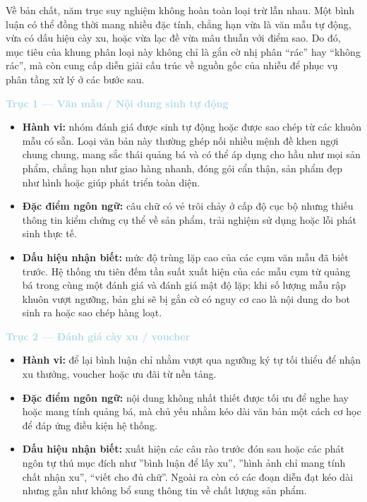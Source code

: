 Về bản chất, năm trục suy nghiệm không hoàn toàn loại trừ lẫn nhau. Một bình luận có thể đồng thời mang nhiều đặc tính, chẳng hạn vừa là văn mẫu tự động, vừa có dấu hiệu cày xu, hoặc vừa lạc đề vừa mâu thuẫn với điểm sao. Do đó, mục tiêu của khung phân loại này không chỉ là gắn cờ nhị phân ``rác'' hay ``không rác'', mà còn cung cấp diễn giải cấu trúc về nguồn gốc của nhiễu để phục vụ phân tầng xử lý ở các bước sau.

\vspace{0.5em}
\noindent\textcolor{lightblue}{\textbf{Trục 1 --- Văn mẫu / Nội dung sinh tự động}}\par
\vspace{0.5em}

\begin{itemize}[labelsep=10pt, leftmargin=2cm]
    \item \textbf{Hành vi:} nhóm đánh giá được sinh tự động hoặc được sao chép từ các khuôn mẫu có sẵn. Loại văn bản này thường ghép nối nhiều mệnh đề khen ngợi chung chung, mang sắc thái quảng bá và có thể áp dụng cho hầu như mọi sản phẩm, chẳng hạn như giao hàng nhanh, đóng gói cẩn thận, sản phẩm đẹp như hình hoặc giúp phát triển toàn diện.
    \item \textbf{Đặc điểm ngôn ngữ:} câu chữ có vẻ trôi chảy ở cấp độ cục bộ nhưng thiếu thông tin kiểm chứng cụ thể về sản phẩm, trải nghiệm sử dụng hoặc lỗi phát sinh thực tế.
    \item \textbf{Dấu hiệu nhận biết:} mức độ trùng lặp cao của các cụm văn mẫu đã biết trước. Hệ thống ưu tiên đếm tần suất xuất hiện của các mẫu cụm từ quảng bá trong cùng một đánh giá và đánh giá mật độ lặp; khi số lượng mẫu rập khuôn vượt ngưỡng, bản ghi sẽ bị gắn cờ có nguy cơ cao là nội dung do bot sinh ra hoặc sao chép hàng loạt.
\end{itemize}

\vspace{0.5em}
\noindent\textcolor{lightblue}{\textbf{Trục 2 --- Đánh giá cày xu / voucher}}\par
\vspace{0.5em}

\begin{itemize}[labelsep=10pt, leftmargin=2cm]
    \item \textbf{Hành vi:} để lại bình luận chỉ nhằm vượt qua ngưỡng ký tự tối thiểu để nhận xu thưởng, voucher hoặc ưu đãi từ nền tảng.
    \item \textbf{Đặc điểm ngôn ngữ:} nội dung không nhất thiết được tối ưu để nghe hay hoặc mang tính quảng bá, mà chủ yếu nhằm kéo dài văn bản một cách cơ học để đáp ứng điều kiện hệ thống.
    \item \textbf{Dấu hiệu nhận biết:} xuất hiện các câu rào trước đón sau hoặc các phát ngôn tự thú mục đích như ''bình luận để lấy xu'', ''hình ảnh chỉ mang tính chất nhận xu'', ``viết cho đủ chữ''. Ngoài ra còn có các đoạn diễn đạt kéo dài nhưng gần như không bổ sung thông tin về chất lượng sản phẩm.
\end{itemize}

